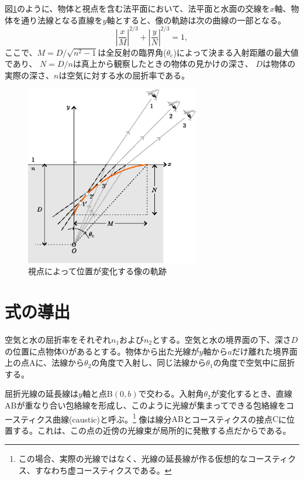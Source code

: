 \documentclass[twocolumn]{article}
\begin{document}
図\ref{fig:caustic}のように、物体と視点を含む法平面において、法平面と水面の交線を$x$軸、物体を通り法線となる直線を$y$軸とすると、像の軌跡は次の曲線の一部となる。
$$ \left| \dfrac{x}{M} \right| ^ {2/3} 
+ \left| \dfrac{y}{N} \right| ^ {2/3} = 1,$$
ここで、$M = D/\sqrt{n^2 - 1}$は全反射の臨界角($\theta_{\mathrm{c}}$)によって決まる入射距離の最大値であり、
$N = D/n$は真上から観察したときの物体の見かけの深さ、
$D$は物体の実際の深さ、$n$は空気に対する水の屈折率である。

\begin{figure}
	\centering
	\includegraphics[width=3in]{figs/g409.eps}
	\caption{視点によって位置が変化する像の軌跡}
	\label{fig:caustic}
\end{figure}
	
\section{式の導出}

空気と水の屈折率をそれぞれ$n_1$および$n_2$とする。空気と水の境界面の下、深さ$D$の位置に点物体$\mathrm{O}$があるとする。物体から出た光線が$y$軸から$a$だけ離れた境界面上の点Aに、法線から$\theta_2$の角度で入射し、同じ法線から$\theta_1$の角度で空気中に屈折する。

屈折光線の延長線は$y$軸と点B$(0, b)$で交わる。入射角$\theta_2$が変化するとき、直線${\mathrm{AB}}$が重なり合い包絡線を形成し、このように光線が集まってできる包絡線をコースティクス曲線(caustic)と呼ぶ。\footnote{この場合、実際の光線ではなく、光線の延長線が作る仮想的なコースティクス、すなわち虚コースティクスである。} 像は線分${\mathrm{AB}}$とコースティクスの接点$\mathrm{C}$に位置する。これは、この点の近傍の光線束が局所的に発散する点だからである。
\end{document}
